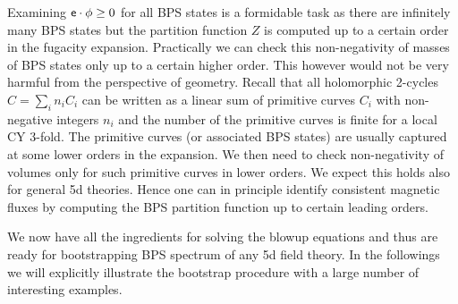 Examining ${\sf e}\cdot\phi \ge 0$ for all BPS states is a formidable task as there are infinitely many BPS states but the partition function $Z$ is computed up to a certain order in the fugacity expansion. Practically we can check this non-negativity of masses of BPS states only up to a certain higher order. This however would not be very harmful from the perspective of geometry. Recall that all holomorphic 2-cycles ${C}=\sum_i n_i C_i$  can be written as a linear sum of primitive curves $C_i$ with non-negative integers $n_i$ and the number of the primitive curves is finite for a local CY 3-fold. The primitive curves (or associated BPS states) are usually captured at some lower orders in the expansion. We then need to check non-negativity of volumes only for such primitive curves in lower orders. We expect this holds also for general 5d theories. Hence one can in principle identify consistent magnetic fluxes by computing the BPS partition function up to certain leading orders.

We now have all the ingredients for solving the blowup equations and thus are ready for bootstrapping BPS spectrum of any 5d field theory. In the followings we will explicitly illustrate the bootstrap procedure with a large number of interesting examples.